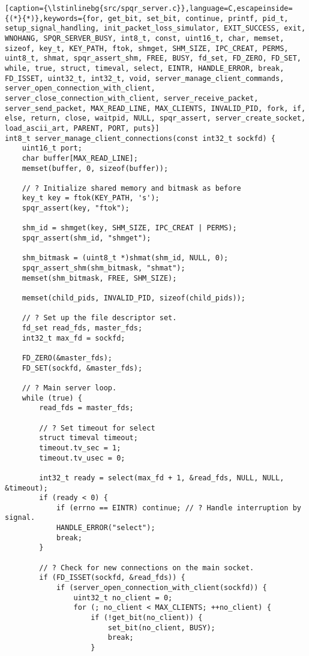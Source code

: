 \begin{lstlisting}[caption={\lstinlinebg{src/spqr_server.c}},language=C,escapeinside={(*}{*)},keywords={for, get_bit, set_bit, continue, printf, pid_t, setup_signal_handling, init_packet_loss_simulator, EXIT_SUCCESS, exit, WNOHANG, SPQR_SERVER_BUSY, int8_t, const, uint16_t, char, memset, sizeof, key_t, KEY_PATH, ftok, shmget, SHM_SIZE, IPC_CREAT, PERMS, uint8_t, shmat, spqr_assert_shm, FREE, BUSY, fd_set, FD_ZERO, FD_SET, while, true, struct, timeval, select, EINTR, HANDLE_ERROR, break, FD_ISSET, uint32_t, int32_t, void, server_manage_client_commands, server_open_connection_with_client, server_close_connection_with_client, server_receive_packet, server_send_packet, MAX_READ_LINE, MAX_CLIENTS, INVALID_PID, fork, if, else, return, close, waitpid, NULL, spqr_assert, server_create_socket, load_ascii_art, PARENT, PORT, puts}]
int8_t server_manage_client_connections(const int32_t sockfd) {
    uint16_t port;
    char buffer[MAX_READ_LINE];
    memset(buffer, 0, sizeof(buffer));

    // ? Initialize shared memory and bitmask as before
    key_t key = ftok(KEY_PATH, 's');
    spqr_assert(key, "ftok");
    
    shm_id = shmget(key, SHM_SIZE, IPC_CREAT | PERMS);
    spqr_assert(shm_id, "shmget");
    
    shm_bitmask = (uint8_t *)shmat(shm_id, NULL, 0);
    spqr_assert_shm(shm_bitmask, "shmat");
    memset(shm_bitmask, FREE, SHM_SIZE);
    
    memset(child_pids, INVALID_PID, sizeof(child_pids));

    // ? Set up the file descriptor set.
    fd_set read_fds, master_fds;
    int32_t max_fd = sockfd;
    
    FD_ZERO(&master_fds);
    FD_SET(sockfd, &master_fds);

    // ? Main server loop.
    while (true) {
        read_fds = master_fds;
        
        // ? Set timeout for select
        struct timeval timeout;
        timeout.tv_sec = 1;
        timeout.tv_usec = 0;

        int32_t ready = select(max_fd + 1, &read_fds, NULL, NULL, &timeout);
        if (ready < 0) {
            if (errno == EINTR) continue; // ? Handle interruption by signal.
            HANDLE_ERROR("select");
            break;
        }

        // ? Check for new connections on the main socket.
        if (FD_ISSET(sockfd, &read_fds)) {
            if (server_open_connection_with_client(sockfd)) {
                uint32_t no_client = 0;
                for (; no_client < MAX_CLIENTS; ++no_client) {
                    if (!get_bit(no_client)) {
                        set_bit(no_client, BUSY);
                        break;
                    }
                    

\end{lstlisting}
